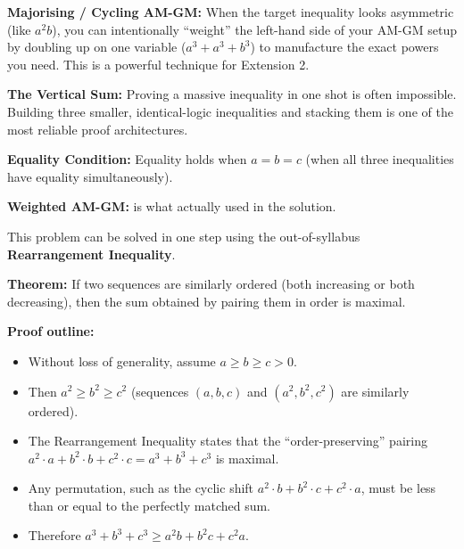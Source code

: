 \begin{takeaways}
\item \textbf{Majorising / Cycling AM-GM:} When the target inequality looks asymmetric (like $a^2b$), you can intentionally ``weight'' the left-hand side of your AM-GM setup by doubling up on one variable ($a^3 + a^3 + b^3$) to manufacture the exact powers you need. This is a powerful technique for Extension 2.
\item \textbf{The Vertical Sum:} Proving a massive inequality in one shot is often impossible. Building three smaller, identical-logic inequalities and stacking them is one of the most reliable proof architectures.
\item \textbf{Equality Condition:} Equality holds when $a = b = c$ (when all three inequalities have equality simultaneously).
\item \textbf{Weighted AM-GM:} is what actually used in the solution.
\end{takeaways}

\begin{remark}
This problem can be solved in one step using the out-of-syllabus \textbf{Rearrangement Inequality}. 

\textbf{Theorem:} If two sequences are similarly ordered (both increasing or both decreasing), then the sum obtained by pairing them in order is maximal.

\textbf{Proof outline:}
\begin{itemize}
    \item Without loss of generality, assume $a \ge b \ge c > 0$.
    \item Then $a^2 \ge b^2 \ge c^2$ (sequences $(a, b, c)$ and $(a^2, b^2, c^2)$ are similarly ordered).
    \item The Rearrangement Inequality states that the ``order-preserving'' pairing $a^2 \cdot a + b^2 \cdot b + c^2 \cdot c = a^3 + b^3 + c^3$ is maximal.
    \item Any permutation, such as the cyclic shift $a^2 \cdot b + b^2 \cdot c + c^2 \cdot a$, must be less than or equal to the perfectly matched sum.
    \item Therefore $a^3 + b^3 + c^3 \ge a^2b + b^2c + c^2a$.
\end{itemize}
\end{remark}


